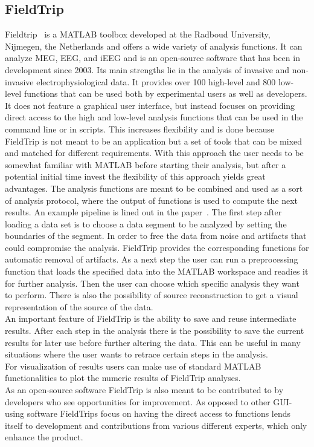 \subsection{FieldTrip}
Fieldtrip~\cite{fieldtrip} is a MATLAB toolbox developed at the Radboud University,  Nijmegen,  the Netherlands and offers a wide variety of analysis functions.  It can analyze MEG, EEG, and iEEG and is an open-source software that has been in development since 2003. Its main strengths lie in the analysis of invasive and non-invasive electrophysiological data. It provides over 100 high-level and 800 low-level functions that can be used both by experimental users as well as developers. It does not feature a graphical user interface, but instead focuses on providing direct access to the high and low-level analysis functions that can be used in the command line or in scripts.  This increases flexibility and is done because FieldTrip is not meant to be an application but a set of tools that can be mixed and matched for different requirements.
With this approach the user needs to be somewhat familiar with MATLAB before starting their analysis, but after a potential initial time invest the flexibility of this approach yields great advantages.
The analysis functions are meant to be combined and used as a sort of analysis protocol, where the output of functions is used to compute the next results. 
An example pipeline is lined out in the paper~\cite{fieldtrip}. The first step after loading a data set is to choose a data segment to be analyzed by setting the boundaries of the segment. In order to free the data from noise and artifacts that could compromise the analysis. FieldTrip provides the corresponding functions for automatic removal of artifacts. As a next step the user can run a preprocessing function that loads the specified data into the MATLAB workspace and readies it for further analysis. Then the user can choose which specific analysis they want to perform. There is also the possibility of source reconstruction to get a visual representation of the source of the data.\\
An important feature of FieldTrip is the ability to save and reuse intermediate results. After each step in the analysis there is the possibility to save the current results for later use before further altering the data. This can be useful in many situations where the user wants to retrace certain steps in the analysis.\\
For visualization of results users can make use of standard MATLAB functionalities to plot the numeric results of FieldTrip analyses.\\
As an open-source software FieldTrip is also meant to be contributed to by developers who see opportunities for improvement. As opposed to other GUI-using software FieldTrips focus on having the direct access to functions lends itself to development and contributions from various different experts, which only enhance the product.

